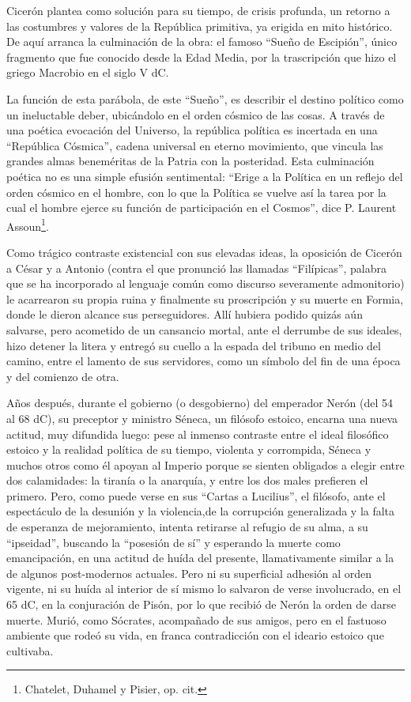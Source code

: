 \documentclass[
]{book}
\begin{document}
Cicerón plantea como solución para su tiempo, de crisis profunda, un retorno a las costumbres y valores de la República primitiva, ya erigida en mito histórico. De aquí arranca la culminación de la obra: el famoso ``Sueño de Escipión'', único fragmento que fue conocido desde la Edad Media, por la trascripción que hizo el griego Macrobio en el siglo V dC.

La función de esta parábola, de este ``Sueño'', es describir el destino político como un ineluctable deber, ubicándolo en el orden cósmico de las cosas. A través de una poética evocación del Universo, la república política es incertada en una ``República Cósmica'', cadena universal en eterno movimiento, que vincula las grandes almas beneméritas de la Patria con la posteridad. Esta culminación poética no es una simple efusión sentimental: ``Erige a la Política en un reflejo del orden cósmico en el hombre, con lo que la Política se vuelve así la tarea por la cual el hombre ejerce su función de participación en el Cosmos'', dice P. Laurent Assoun\footnote{Chatelet, Duhamel y Pisier, op. cit.}.

Como trágico contraste existencial con sus elevadas ideas, la oposición de Cicerón a César y a Antonio (contra el que pronunció las llamadas ``Filípicas'', palabra que se ha incorporado al lenguaje común como discurso severamente admonitorio) le acarrearon su propia ruina y finalmente su proscripción y su muerte en Formia, donde le dieron alcance sus perseguidores. Allí hubiera podido quizás aún salvarse, pero acometido de un cansancio mortal, ante el derrumbe de sus ideales, hizo detener la litera y entregó su cuello a la espada del tribuno en medio del camino, entre el lamento de sus servidores, como un símbolo del fin de una época y del comienzo de otra.

Años después, durante el gobierno (o desgobierno) del emperador Nerón (del 54 al 68 dC), su preceptor y ministro Séneca, un filósofo estoico, encarna una nueva actitud, muy difundida luego: pese al inmenso contraste entre el ideal filosófico estoico y la realidad política de su tiempo, violenta y corrompida, Séneca y muchos otros como él apoyan al Imperio porque se sienten obligados a elegir entre dos calamidades: la tiranía o la anarquía, y entre los dos males prefieren el primero. Pero, como puede verse en sus ``Cartas a Lucilius'', el filósofo, ante el espectáculo de la desunión y la violencia,de la corrupción generalizada y la falta de esperanza de mejoramiento, intenta retirarse al refugio de su alma, a su ``ipseidad'', buscando la ``posesión de sí'' y esperando la muerte como emancipación, en una actitud de huída del presente, llamativamente similar a la de algunos post-modernos actuales. Pero ni su superficial adhesión al orden vigente, ni su huída al interior de sí mismo lo salvaron de verse involucrado, en el 65 dC, en la conjuración de Pisón, por lo que recibió de Nerón la orden de darse muerte. Murió, como Sócrates, acompañado de sus amigos, pero en el fastuoso ambiente que rodeó su vida, en franca contradicción con el ideario estoico que cultivaba.
\end{document}
